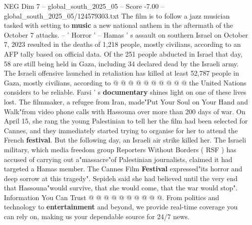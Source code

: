 \begin{textsample}{NEG Dim 7 – global\_south\_2025\_05 – Score -7.00 – global\_south\_2025\_05/124579303.txt}
The film is to follow a jazz musician tasked with setting to \textbf{music} a new national anthem in the aftermath of the October 7 attacks. -- ' Horror ' -- Hamas ' s assault on southern Israel on October 7, 2023 resulted in the deaths of 1,218 people, mostly civilians, according to an AFP tally based on official data.
Of the 251 people abducted in Israel that day, 58 are still being held in Gaza, including 34 declared dead by the Israeli army.
The Israeli offensive launched in retaliation has killed at least 52,787 people in Gaza, mostly civilians, according to @ @ @ @ @ @ @ @ @ @ the United Nations considers to be reliable.
Farsi ' s \textbf{documentary} shines light on one of these lives lost.
The filmmaker, a refugee from Iran, made"Put Your Soul on Your Hand and Walk"from video phone calls with Hassouna over more than 200 days of war.
On April 15, she rang the young Palestinian to tell her the film had been selected for Cannes, and they immediately started trying to organise for her to attend the French \textbf{festival}.
But the following day, an Israeli air strike killed her.
The Israeli military, which media freedom group Reporters Without Borders ( RSF ) has accused of carrying out a"massacre"of Palestinian journalists, claimed it had targeted a Hamas member.
The Cannes Film \textbf{Festival} expressed"its horror and deep sorrow at this tragedy".
Sepideh said she had believed until the very end that Hassouna"would survive, that she would come, that the war would stop".
Information You Can Trust @ @ @ @ @ @ @ @ @ @.
From politics and technology to \textbf{entertainment} and beyond, we provide real-time coverage you can rely on, making us your dependable source for 24/7 news.

\end{textsample}
